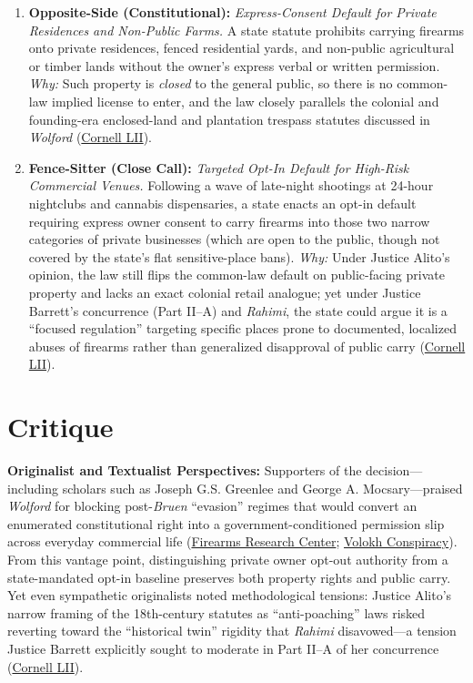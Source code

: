 \documentclass[12pt]{article}
\begin{document}
\begin{enumerate}
\item \textbf{Opposite-Side (Constitutional):} \textit{Express-Consent Default for Private Residences and Non-Public Farms.} A state statute prohibits carrying firearms onto private residences, fenced residential yards, and non-public agricultural or timber lands without the owner's express verbal or written permission. \textit{Why:} Such property is \textit{closed} to the general public, so there is no common-law implied license to enter, and the law closely parallels the colonial and founding-era enclosed-land and plantation trespass statutes discussed in \textit{Wolford} (\href{https://www.law.cornell.edu/supremecourt/text/24-1046}{Cornell LII}).

\item \textbf{Fence-Sitter (Close Call):} \textit{Targeted Opt-In Default for High-Risk Commercial Venues.} Following a wave of late-night shootings at 24-hour nightclubs and cannabis dispensaries, a state enacts an opt-in default requiring express owner consent to carry firearms into those two narrow categories of private businesses (which are open to the public, though not covered by the state's flat sensitive-place bans). \textit{Why:} Under Justice Alito's opinion, the law still flips the common-law default on public-facing private property and lacks an exact colonial retail analogue; yet under Justice Barrett's concurrence (Part II--A) and \textit{Rahimi}, the state could argue it is a ``focused regulation'' targeting specific places prone to documented, localized abuses of firearms rather than generalized disapproval of public carry (\href{https://www.law.cornell.edu/supremecourt/text/24-1046}{Cornell LII}).
\end{enumerate}

\section{Critique}
\textbf{Originalist and Textualist Perspectives:} Supporters of the decision---including scholars such as Joseph G.S. Greenlee and George A. Mocsary---praised \textit{Wolford} for blocking post-\textit{Bruen} ``evasion'' regimes that would convert an enumerated constitutional right into a government-conditioned permission slip across everyday commercial life (\href{https://firearmsresearchcenter.org/working_papers/vampire-rules-monarchical-legacies-and-black-codes-wolford-v-lopez-and-the-limits-of-post-bruen-evasion/}{Firearms Research Center}; \href{https://reason.com/volokh/2026/10/28/how-wolford-v-lopez-refines-second-amendment-doctrine/}{Volokh Conspiracy}). From this vantage point, distinguishing private owner opt-out authority from a state-mandated opt-in baseline preserves both property rights and public carry. Yet even sympathetic originalists noted methodological tensions: Justice Alito's narrow framing of the 18th-century statutes as ``anti-poaching'' laws risked reverting toward the ``historical twin'' rigidity that \textit{Rahimi} disavowed---a tension Justice Barrett explicitly sought to moderate in Part II--A of her concurrence (\href{https://www.law.cornell.edu/supremecourt/text/24-1046}{Cornell LII}).
\end{document}
